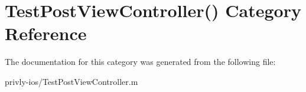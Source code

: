 \hypertarget{category_test_post_view_controller_07_08}{\section{Test\-Post\-View\-Controller() Category Reference}
\label{category_test_post_view_controller_07_08}
}


The documentation for this category was generated from the following file\-:\begin{DoxyCompactItemize}
\item 
privly-\/ios/Test\-Post\-View\-Controller.\-m\end{DoxyCompactItemize}
